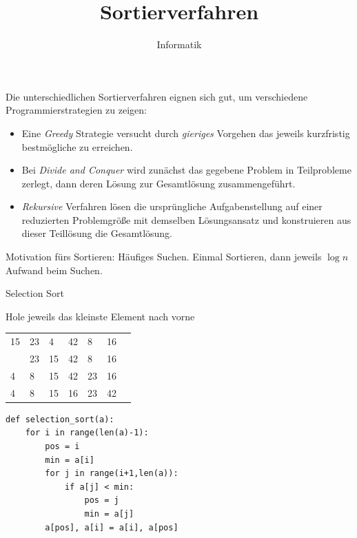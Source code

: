 \documentclass{beamer}
\begin{document}
\title{Sortierverfahren}   
\author{Informatik} 
\date{ } 


\lstset{language=Python, tabsize=4, showstringspaces=false,basicstyle=\footnotesize,mathescape=true}

\frame{\titlepage} 

\begin{frame}[fragile]

Die unterschiedlichen Sortierverfahren eignen sich gut, um verschiedene Programmierstrategien
zu zeigen: \pause
\begin{itemize}
\item Eine \textit{Greedy} Strategie versucht durch \textit{gieriges} Vorgehen das jeweils kurzfristig bestmögliche zu erreichen. \pause
\item Bei \textit{Divide and Conquer} wird zunächst das gegebene Problem in Teilprobleme zerlegt, dann deren Lösung zur Gesamtlösung zusammengeführt. \pause 
\item \textit{Rekursive} Verfahren lösen die ursprüngliche Aufgabenstellung auf einer reduzierten Problemgröße mit demselben Lösungsansatz und konstruieren aus dieser Teillösung die Gesamtlösung.
\end{itemize}

Motivation fürs Sortieren: \pause
 Häufiges Suchen. Einmal Sortieren, dann jeweils $\log n$ Aufwand beim Suchen.
\end{frame}


\begin{frame}[fragile]

Selection Sort 

\glqq Hole jeweils das kleinste Element nach vorne\grqq  

\begin{tabular}{lllllll}
15 & 23 & 4 & 42 & 8 & 16 \\ \pause
4 & 23 & 15 & 42 & 8 & 16 \\  
4 & 8 & 15 &  42 & 23 &  16  \\   
 4 & 8 & 15 & 16 & 23  &  42  \\ 
\end{tabular}
\end{frame}

\begin{frame}[fragile]
\begin{lstlisting} 
def selection_sort(a):
    for i in range(len(a)-1):
        pos = i
        min = a[i]
        for j in range(i+1,len(a)):
            if a[j] < min:
                pos = j
                min = a[j]
        a[pos], a[i] = a[i], a[pos]
 \end{lstlisting} 
\end{frame}
\end{document}
